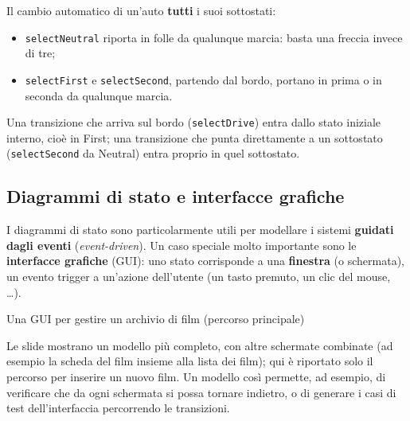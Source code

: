 \begin{esempio}{Il cambio automatico di un'auto}
\textbf{tutti} i suoi sottostati:
\begin{itemize}
  \item \texttt{selectNeutral} riporta in folle da qualunque marcia: basta una freccia invece di tre;
  \item \texttt{selectFirst} e \texttt{selectSecond}, partendo dal bordo, portano in prima o in seconda da qualunque marcia.
\end{itemize}
Una transizione che arriva sul bordo (\texttt{selectDrive}) entra dallo stato iniziale interno, cioè in First; una transizione che
punta direttamente a un sottostato (\texttt{selectSecond} da Neutral) entra proprio in quel sottostato.
\end{esempio}

\subsection{Diagrammi di stato e interfacce grafiche}

I diagrammi di stato sono particolarmente utili per modellare i sistemi \textbf{guidati dagli eventi} (\textit{event-driven}).
Un caso speciale molto importante sono le \textbf{interfacce grafiche} (GUI): uno stato corrisponde a una \textbf{finestra} (o
schermata), un evento trigger a un'azione dell'utente (un tasto premuto, un clic del mouse, \ldots).

\begin{esempio}{Una GUI per gestire un archivio di film (percorso principale)}
\begin{center}
\end{center}
Le slide mostrano un modello più completo, con altre schermate combinate (ad esempio la scheda del film insieme alla lista dei film);
qui è riportato solo il percorso per inserire un nuovo film. Un modello così permette, ad esempio, di verificare che da ogni schermata
si possa tornare indietro, o di generare i casi di test dell'interfaccia percorrendo le transizioni.
\end{esempio}

